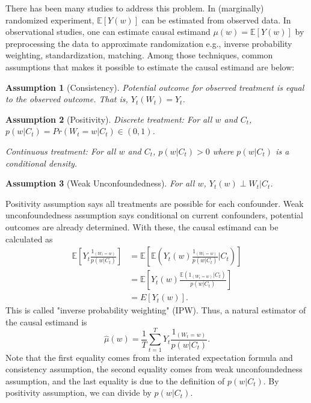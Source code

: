 \documentclass[12pt]{article}
\newtheorem{asm}{Assumption}
\begin{document}
There has been many studies to address this problem.
In (marginally) randomized experiment, 
$\mathbb{E}[Y(w)]$ can be estimated from observed data\cite{rubin1974}.
In observational studies, 
one can estimate causal estimand $\mu(w) = \mathbb{E}[Y(w)]$ by preprocessing the data to approximate randomization 
e.g., inverse probability weighting, standardization, matching\cite{rosenbaum1983}.
Among those techniques, 
common assumptions that makes it possible to estimate the causal estimand are below:

\begin{asm}[Consistency]\hfill

	Potential outcome for observed treatment is equal to the observed outcome.
	That is, $Y_t(W_t) = Y_t$.
\end{asm}

\begin{asm}[Positivity]\hfill
	Discrete treatment:
	For all $w$ and $C_t$, $p(w\lvert C_t) = Pr\left ( W_t = w \lvert C_t\right ) \in (0, 1)$.

	Continuous treatment:
	For all $w$ and $C_t$, $p(w\lvert C_t) > 0$ where $p(w\lvert C_t)$ is a conditional density.
\end{asm}


\begin{asm}[Weak Unconfoundedness] \hfill

	For all $w$, $Y_{t}(w) \perp W_t \lvert C_t$.
\end{asm}


Positivity assumption says all treatments are possible for each confounder.
Weak unconfoundedness assumption says
conditional on current confounders, potential outcomes are already determined.
With these, the causal estimand can be calculated as
\[
	\begin{split}
		\mathbb{E}\left[ Y_t\frac{1_{(W_t = w)}}{p(w\lvert C_t)} \right]
		& = \mathbb{E}\left[ \mathbb{E}\left( Y_t(w) \frac{1_{(W_t = w)}}{p(w\lvert C_t)} \lvert C_t\right)\right]\\
		& = \mathbb{E}\left[ Y_t(w)\frac{\mathbb{E}\left( 1_{(W_t = w)}\lvert C_t \right)}{p(w\lvert C_t)} \right]\\
		& = E\left[ Y_t(w) \right].
	\end{split}
\]
This is called "inverse probability weighting" (IPW).
Thus, a natural estimator of the causal estimand is
\[
	\hat{\mu}(w) = \frac{1}{T}\sum_{t = 1}^T Y_t \frac{1_{(W_t = w)}}{p(w\lvert C_t)}.	
\]
Note that the first equality comes from the interated expectation formula and consistency assumption,
the second equality comes from weak unconfoundedness assumption,
and the last equality is due to the definition of $p(w\lvert C_t)$.
By positivity assumption, we can divide by $p(w\lvert C_t)$.
\end{document}
